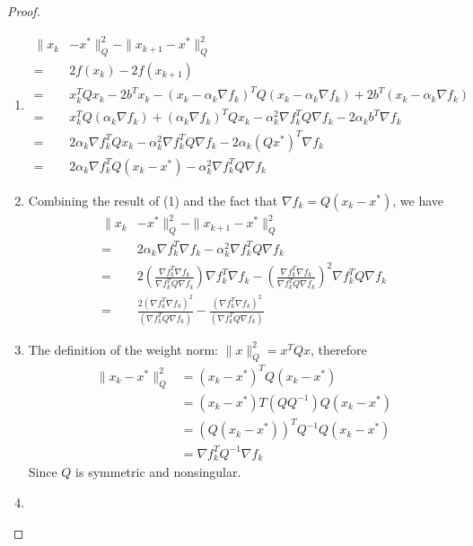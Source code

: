 \documentclass[11pt,a4paper]{article}
\renewcommand{\(}{\left(}
\renewcommand{\)}{\right)}
\begin{document}
  \begin{proof}
  	\begin{enumerate}[(1)]
  		\item 
  		\begin{align*}
  		\|x_{k} &- x^{*}\|^{2}_{Q}-\|x_{k+1} - x^{*}\|^{2}_{Q}\\
  		=~&2f(x_{k})-2f(x_{k+1})\\
  		=~&x_k^{T}Qx_{k}-2b^{T}x_{k}-(x_{k}-\alpha_{k}\nabla f_{k})^{T}Q(x_{k}-\alpha_{k}\nabla f_{k})+2b^{T}(x_{k}-\alpha_{k}\nabla f_{k})\\
  		=~&x_{k}^{T}Q(\alpha_{k}\nabla f_{k})+(\alpha_{k}\nabla f_{k})^{T}Qx_{k}-\alpha_{k}^{2}\nabla f_{k}^{T}Q\nabla f_{k}-2\alpha_{k}b^{T}\nabla f_{k}\\
  		=~&2\alpha_{k}\nabla f_{k}^{T}Qx_{k}-\alpha_{k}^{2}\nabla f_{k}^{T}Q\nabla f_{k}-2\alpha_{k}(Qx^{*})^{T}\nabla f_{k}\\
  		=~&2\alpha_{k}\nabla f_{k}^{T}Q(x_{k} - x^{*})-\alpha_{k}^{2}\nabla f_{k}^{T}Q\nabla f_{k}
  		\end{align*}
  		\item
  		Combining the result of (1) and the fact that $\nabla f_{k}=Q(x_{k} - x^{*})$, we have
  		\begin{align*}
  		\|x_{k} &- x^{*}\|^{2}_{Q}-\|x_{k+1} - x^{*}\|^{2}_{Q}\\
  		=~&2\alpha_{k}\nabla f_{k}^{T}\nabla f_{k} - \alpha_{k}^{2}\nabla f_{k}^{T}Q\nabla f_{k}\\
  		=~&2(\frac{\nabla f_{k}^{T}\nabla f_{k}}{\nabla f_{k}^{T}Q\nabla f_{k}})\nabla f_{k}^{T}\nabla f_{k}-(\frac{\nabla f_{k}^{T}\nabla f_{k}}{\nabla f_{k}^{T}Q\nabla f_{k}})^{2}\nabla f_{k}^{T}Q\nabla f_{k}\\
  		=~&\frac{2(\nabla f_{k}^{T}\nabla f_{k})^2}{(\nabla f^{T}_{k}Q\nabla f_{k})}-\frac{(\nabla f_{k}^{T}\nabla f_{k})^2}{(\nabla f^{T}_{k}Q\nabla f_{k})}
  		\end{align*}
  		\item
  		The definition of the weight norm: $\|x\|^{2}_{Q}=x^{T}Qx$, therefore
  		\begin{align*}
  		\|x_{k}-x^{*}\|^{2}_{Q} &= (x_{k}-x^{*})^{T}Q(x_{k}-x^{*})\\
  		&=(x_{k}-x^{*})T(QQ^{-1})Q(x_{k}-x^{*})\\
  		&=(Q(x_{k}-x^{*}))^{T}Q^{-1}Q(x_{k}-x^{*})\\
  		&=\nabla f_{k}^{T}Q^{-1}\nabla f_k
  		\end{align*}
  		Since $Q$ is symmetric and nonsingular.
  		\item

\end{enumerate}
\end{proof}
\end{document}
